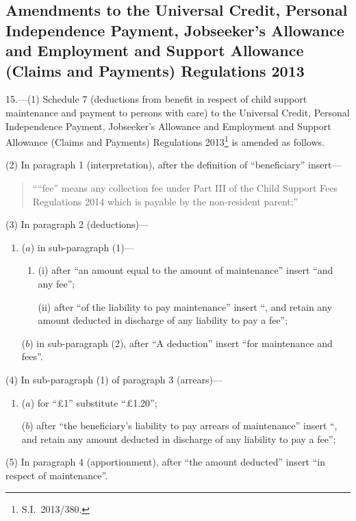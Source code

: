 \documentclass[12pt,a4paper]{article}
\begin{document}
\subsection[15. Amendments to the Universal Credit, Personal Independence Payment, Jobseeker’s Allowance and Employment and Support Allowance (Claims and Payments) Regulations 2013]{Amendments to the Universal Credit, Personal Independence Payment, Jobseeker’s Allowance and Employment and Support Allowance (Claims and Payments) Regulations 2013}

15.—(1) Schedule 7 (deductions from benefit in respect of child support maintenance and payment to persons with care) to the Universal Credit, Personal Independence Payment, Jobseeker’s Allowance and Employment and Support Allowance (Claims and Payments) Regulations 2013\footnote{S.I.~2013/380.} is amended as follows.

(2) In paragraph 1 (interpretation), after the definition of “beneficiary” insert—
\begin{quotation}
““fee” means any collection fee under Part III of the Child Support Fees Regulations 2014 which is payable by the non-resident parent;”
\end{quotation}

(3) In paragraph 2 (deductions)—
\begin{enumerate}\item[]
($a$) in sub-paragraph (1)—
\begin{enumerate}\item[]
(i) after “an amount equal to the amount of maintenance” insert “and any fee”;

(ii) after “of the liability to pay maintenance” insert “, and retain any amount deducted in discharge of any liability to pay a fee”;
\end{enumerate}

($b$) in sub-paragraph (2), after “A deduction” insert “for maintenance and fees”.
\end{enumerate}

(4) In sub-paragraph (1) of paragraph 3 (arrears)—
\begin{enumerate}\item[]
($a$) for “£1” substitute “£1$.$20”;

($b$) after “the beneficiary’s liability to pay arrears of maintenance” insert “, and retain any amount deducted in discharge of any liability to pay a fee”;
\end{enumerate}

(5) In paragraph 4 (apportionment), after “the amount deducted” insert “in respect of maintenance”.
\end{document}
